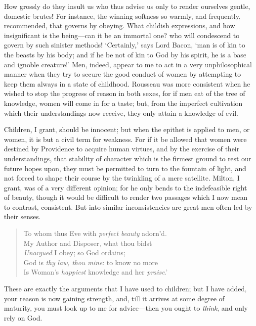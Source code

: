 How grossly do they insult us who thus advise us only to render
ourselves gentle, domestic  brutes! For instance, the winning
softness so warmly, and frequently, recommended, that governs by
obeying. What childish expressions, and how insignificant is the
be\-ing---can it be an immortal one? who will condescend to govern by
such sinister methods! `Certainly,' says Lord Bacon, `man is of kin to
the beasts by his body; and if he be not of kin to God by his spirit,
he is a base and ignoble creature!' Men, indeed, appear to me to act
in a very unphilosophical manner when they try to secure the good
conduct of women by attempting to keep them always in a state of
childhood. Rousseau was more consistent when he wished to stop the
progress of reason in both sexes, for if men eat of the tree of
knowledge, women will come in for a taste; but, from the imperfect
cultivation which their understandings now receive, they only attain a
knowledge of evil.

Children, I grant, should be innocent; but when the epithet is applied
to men, or women, it is but a civil term for weakness. For if it be
allowed that women were destined by Providence to acquire human
virtues, and by the exercise of their understandings, that stability
of character which is the firmest  ground to rest our future
hopes upon, they must be permitted to turn to the fountain of light,
and not forced to shape their course by the twinkling of a mere
satellite. Milton, I grant, was of a very different opinion; for he
only bends to the indefeasible right of beauty, though it would be
difficult to render two passages which I now mean to contrast,
consistent. But into similar inconsistencies are great men often led
by their senses.

\begin{verse}
To whom thus Eve with \textit{perfect beauty} adorn'd.\\
My Author and Disposer, what thou bidst\\
\textit{Unargued} I obey; so God ordains;\\
God is \textit{thy law, thou mine}: to know no more\\
Is Woman's \textit{happiest} knowledge and her \textit{praise}.'
\end{verse}

These are exactly the arguments that I have used to children; but I
have added, your reason is now gaining strength, and, till it arrives
at some degree of maturity, you must look up to me for ad\-vice---then
you ought to \textit{think}, and only rely on God.

